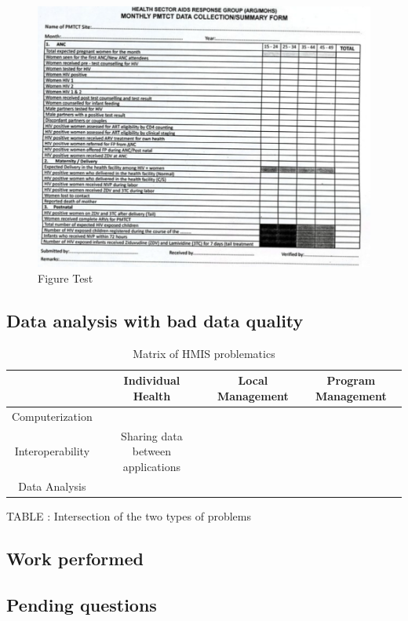 \documentclass[a4paper,11pt,final,twoside]{article}
\begin{document}
\begin{figure}[ht]
\begin{center}
\includegraphics[scale=0.5]{figure/Picture1.png} 
\caption{Figure Test}
\end{center}
\end{figure}


		\subsection{Data analysis with bad data quality}  

\begin{table}[ht]
\begin{tabular}{cccc}
\hline 
 					& Individual Health & Local Management & Program Management \\ 
\hline 
Computerization & & \\
\hline
Interoperability 	& Sharing data between applications  &  &  \\ 
\hline 
Data Analysis &  &  &  \\ 
\hline 
\end{tabular} 
\caption{Matrix of HMIS problematics}
\end{table}

TABLE : Intersection of the two types of problems
	
	\subsection{Work performed}	
	
	\subsection{Pending questions}
\end{document}

